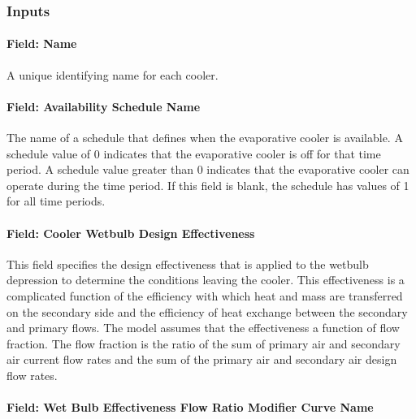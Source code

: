 \subsubsection{Inputs}\label{inputs-4-011}

\paragraph{Field: Name}\label{field-name-4-010}

A unique identifying name for each cooler.

\paragraph{Field: Availability Schedule Name}\label{field-availability-schedule-name-1-004}

The name of a schedule that defines when the evaporative cooler is available. A schedule value of 0 indicates that the evaporative cooler is off for that time period. A schedule value greater than 0 indicates that the evaporative cooler can operate during the time period. If this field is blank, the schedule has values of 1 for all time periods.

\paragraph{Field: Cooler Wetbulb Design Effectiveness}\label{field-cooler-wetbulb-design-effectiveness}

This field specifies the design effectiveness that is applied to the wetbulb depression to determine the conditions leaving the cooler. This effectiveness is a complicated function of the efficiency with which heat and mass are transferred on the secondary side and the efficiency of heat exchange between the secondary and primary flows. The model assumes that the effectiveness a function of flow fraction. The flow fraction is the ratio of the sum of primary air and secondary air current flow rates and the sum of the primary air and secondary air design flow rates.

\paragraph{Field: Wet Bulb Effectiveness Flow Ratio Modifier Curve Name}\label{field-wet-bulb-effectiveness-flow-ratio-modifier-curve-name}

